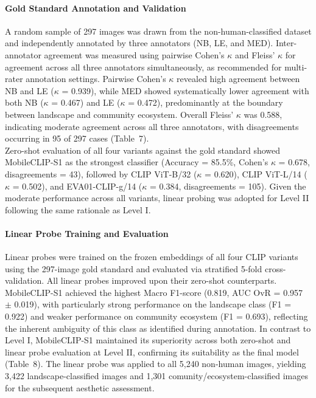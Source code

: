 \documentclass[hidelinks, 11pt]{article}
\begin{document}
\paragraph{Gold Standard Annotation and Validation}
A random sample of 297 images was drawn from the non-human-classified dataset and independently annotated by three annotators (NB, LE, and MED). Inter-annotator agreement was measured using pairwise Cohen's $\kappa$ and Fleiss' $\kappa$ \citep{fleiss_measuring_1971} for agreement across all three annotators simultaneously, as recommended for multi-rater annotation settings. Pairwise Cohen's $\kappa$ revealed high agreement between NB and LE ($\kappa$ = 0.939), while MED showed systematically lower agreement with both NB ($\kappa$ = 0.467) and LE ($\kappa$ = 0.472), predominantly at the boundary between landscape and community ecosystem. Overall Fleiss' $\kappa$ was 0.588, indicating moderate agreement across all three annotators, with disagreements occurring in 95 of 297 cases (Table~7).
\\
Zero-shot evaluation of all four variants against the gold standard showed MobileCLIP-S1 as the strongest classifier (Accuracy = 85.5\%, Cohen's $\kappa$ = 0.678, disagreements = 43), followed by CLIP ViT-B/32 ($\kappa$ = 0.620), CLIP ViT-L/14 ($\kappa$ = 0.502), and EVA01-CLIP-g/14 ($\kappa$ = 0.384, disagreements = 105). Given the moderate performance across all variants, linear probing was adopted for Level II following the same rationale as Level I.

\paragraph{Linear Probe Training and Evaluation}
Linear probes were trained on the frozen embeddings of all four CLIP variants using the 297-image gold standard and evaluated via stratified 5-fold cross-validation. All linear probes improved upon their zero-shot counterparts. MobileCLIP-S1 achieved the highest Macro F1-score (0.819, AUC OvR = 0.957 $\pm$ 0.019), with particularly strong performance on the landscape class (F1 = 0.922) and weaker performance on community ecosystem (F1 = 0.693), reflecting the inherent ambiguity of this class as identified during annotation. In contrast to Level I, MobileCLIP-S1 maintained its superiority across both zero-shot and linear probe evaluation at Level II, confirming its suitability as the final model (Table~8). The linear probe was applied to all 5,240 non-human images, yielding 3,422 landscape-classified images and 1,301 comunity/ecosystem-classified images for the subsequent aesthetic assessment.
\end{document}
